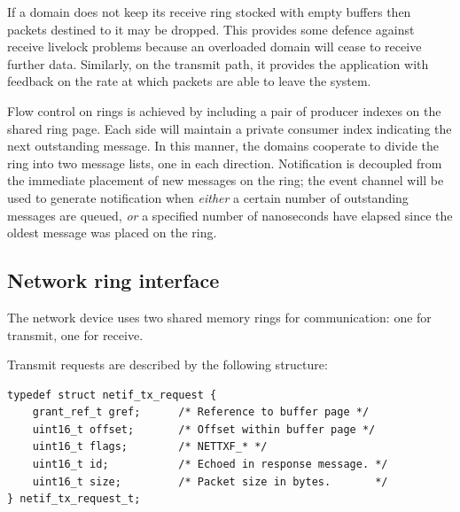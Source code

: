 \documentclass[11pt,twoside,final,openright]{report}
\begin{document}

If a domain does not keep its receive ring stocked with empty buffers
then packets destined to it may be dropped.  This provides some
defence against receive livelock problems because an overloaded domain
will cease to receive further data.  Similarly, on the transmit path,
it provides the application with feedback on the rate at which packets
are able to leave the system.

Flow control on rings is achieved by including a pair of producer
indexes on the shared ring page.  Each side will maintain a private
consumer index indicating the next outstanding message.  In this
manner, the domains cooperate to divide the ring into two message
lists, one in each direction.  Notification is decoupled from the
immediate placement of new messages on the ring; the event channel
will be used to generate notification when {\em either} a certain
number of outstanding messages are queued, {\em or} a specified number
of nanoseconds have elapsed since the oldest message was placed on the
ring.



\subsection{Network ring interface}

The network device uses two shared memory rings for communication: one
for transmit, one for receive.

Transmit requests are described by the following structure:

\scriptsize
\begin{verbatim}
typedef struct netif_tx_request {
    grant_ref_t gref;      /* Reference to buffer page */
    uint16_t offset;       /* Offset within buffer page */
    uint16_t flags;        /* NETTXF_* */
    uint16_t id;           /* Echoed in response message. */
    uint16_t size;         /* Packet size in bytes.       */
} netif_tx_request_t;
\end{verbatim}
\normalsize
\end{document}
